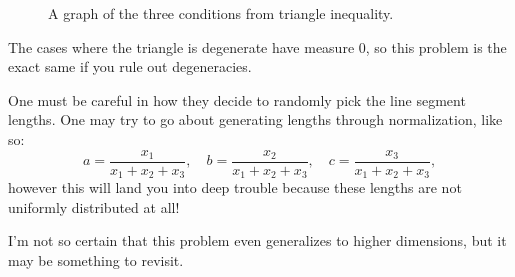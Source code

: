 \documentclass[a5paper]{article}
\begin{document}
\begin{figure}
    \centering
    \caption{A graph of the three conditions from triangle inequality.}
\end{figure}

\begin{remark}
    The cases where the triangle is degenerate have measure \( 0 \), so this
    problem is the exact same if you rule out degeneracies.
\end{remark}

\begin{remark}
    One must be careful in how they decide to randomly pick the line segment
    lengths. One may try to go about generating lengths through normalization, like so:
    \[
        a = \frac{x_1}{x_1 + x_2 + x_3}, \quad b = \frac{x_2}{x_1 + x_2 + x_3}, \quad c = \frac{x_3}{x_1 + x_2 + x_3}
    ,\]
    however this will land you into deep trouble because these lengths are not uniformly distributed at all!
\end{remark}

I'm not so certain that this problem even generalizes to higher dimensions, but
it may be something to revisit.
\end{document}
